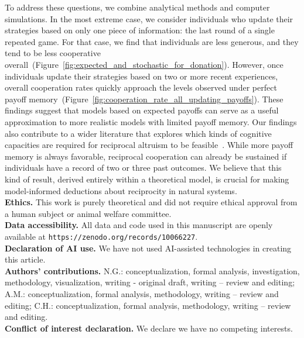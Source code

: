 \documentclass[11pt]{article}
\newcommand{\FigBaseResults}{Figure~\ref{fig:expected_and_stochastic_for_donation}}
\newcommand{\FigHigherMemory}{Figure~\ref{fig:cooperation_rate_all_updating_payoffs}}
\theoremstyle{plainCl1}
\theoremstyle{plainCl2}
\begin{document}
To address these questions, we combine analytical methods and computer simulations. 
In the most extreme case, we consider individuals who update their strategies based on only one piece of information:  the last round of a single repeated game. 
For that case, we find that individuals are less generous, and they tend to be less cooperative overall~(\FigBaseResults). 
However, once individuals update their strategies based on two or more recent experiences, overall cooperation rates quickly approach the levels observed under perfect payoff memory~(\FigHigherMemory). 
These findings suggest that models based on expected payoffs can serve as a useful approximation to more realistic models with limited payoff memory. 
Our findings also contribute to a wider literature that explores which kinds of cognitive capacities are required for reciprocal altruism to be feasible~\citep[e.g.,][]{Stevens:fip:2011,Volstorf:PlosOne:2011}. 
While more payoff memory is always favorable, reciprocal cooperation can already be sustained if individuals have a record of two or three past outcomes. We believe that this kind of result, derived entirely within a theoretical model, is crucial for making model-informed deductions about reciprocity in natural systems.\\[0.5cm]


\noindent
{\bf Ethics.}
This work is purely theoretical and did not require ethical approval from a human subject or animal welfare committee.\\

\noindent
{\bf Data accessibility.}
All data and code used in this manuscript are openly available at\newline
\texttt{https://zenodo.org/records/10066227}.\\

\noindent
{\bf Declaration of AI use.}
We have not used AI-assisted technologies in creating this article.\\

\noindent
{\bf Authors' contributions.}
N.G.: conceptualization, formal analysis, investigation, methodology, visualization, writing - original draft, writing -- review and editing; 
A.M.: conceptualization, formal analysis, methodology, writing -- review and editing; 
C.H.: conceptualization, formal analysis, methodology, writing -- review and editing.\\

\noindent
{\bf Conflict of interest declaration.}
We declare we have no competing interests.\\
\end{document}
